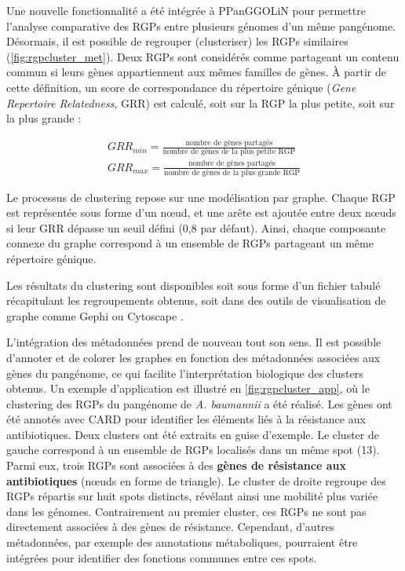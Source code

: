 Une nouvelle fonctionnalité a été intégrée à PPanGGOLiN pour permettre l’analyse comparative des RGPs entre plusieurs génomes d’un même pangénome. Désormais, il est possible de regrouper (clusteriser) les RGPs similaires  (\autoref{fig:rgpcluster_met}). Deux RGPs sont considérés comme partageant un contenu commun si leurs gènes appartiennent aux mêmes familles de gènes. À partir de cette définition, un score de correspondance du répertoire génique (\textit{Gene Repertoire Relatedness}, GRR) est calculé, soit sur la RGP la plus petite, soit sur la plus grande :

\begin{equation}
\begin{split}
GRR_{min} = \frac{\text{nombre de gènes partagés}}{\text{nombre de gènes de la plus petite RGP}} \\
GRR_{max} = \frac{\text{nombre de gènes partagés}}{\text{nombre de gènes de la plus grande RGP}}
\end{split}
\end{equation}

Le processus de clustering repose sur une modélisation par graphe. Chaque RGP est représentée sous forme d’un n\oe ud, et une arête est ajoutée entre deux n\oe uds si leur GRR dépasse un seuil défini (0,8 par défaut). Ainsi, chaque composante connexe du graphe correspond à un ensemble de RGPs partageant un même répertoire génique.

Les résultats du clustering sont disponibles soit sous forme d'un fichier tabulé récapitulant les regroupements obtenus, soit dans des outils de visualisation de graphe comme Gephi \cite{bastian_gephi_2009} ou Cytoscape \cite{shannon_cytoscape_2003}.

L’intégration des métadonnées prend de nouveau tout son sens. Il est possible d’annoter et de colorer les graphes en fonction des métadonnées associées aux gènes du pangénome, ce qui facilite l’interprétation biologique des clusters obtenus. Un exemple d’application est illustré en \autoref{fig:rgpcluster_app}, où le clustering des RGPs du pangénome de \textit{A. baumannii} a été réalisé. Les gènes ont été annotés avec CARD \cite{alcock_card_2023} pour identifier les éléments liés à la résistance aux antibiotiques. Deux clusters ont été extraits en guise d'exemple. Le cluster de gauche correspond à un ensemble de RGPs localisés dans un même spot (13). Parmi eux, trois RGPs sont associées à des \textbf{gènes de résistance aux antibiotiques }(n\oe uds en forme de triangle). Le cluster de droite regroupe des RGPs répartis sur huit spots distincts, révélant ainsi une mobilité plus variée dans les génomes. Contrairement au premier cluster, ces RGPs ne sont pas directement associées à des gènes de résistance. Cependant, d’autres métadonnées, par exemple des annotations métaboliques, pourraient être intégrées pour identifier des fonctions communes entre ces spots.


